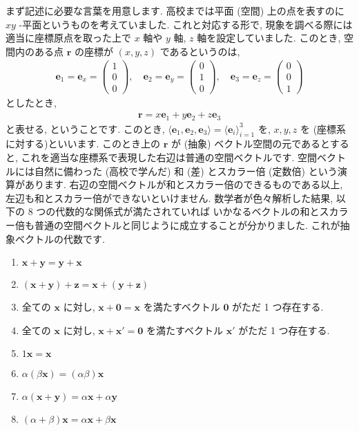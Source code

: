 \documentclass[openany, a4paper, oneside]{jsbook}
\begin{document}
まず記述に必要な言葉を用意します.
高校までは平面 (空間) 上の点を表すのに $x y$ -平面というものを考えていました.
これと対応する形で, 現象を調べる際には適当に座標原点を取った上で $x$ 軸や $y$ 軸,  $z$ 軸を設定していました.
このとき, 空間内のある点 $\bm{r}$ の座標が $(x,y,z)$ であるというのは,
\begin{align}
    \bm{e}_1
    =
    \bm{e}_x
    =
    \begin{pmatrix}
        1 \\ 0 \\ 0
    \end{pmatrix},
    \quad
    \bm{e}_2
    =
    \bm{e}_y
    =
    \begin{pmatrix}
        0 \\ 1 \\ 0
    \end{pmatrix},
    \quad
    \bm{e}_3
    =
    \bm{e}_z
    =
    \begin{pmatrix}
        0 \\ 0 \\ 1
    \end{pmatrix}
\end{align}
としたとき,
\begin{align}
    \bm{r}
    =
    x \bm{e}_1 + y \bm{e}_2 + z \bm{e}_3
\end{align}
と表せる, ということです.
このとき,
$\langle \bm{e}_1 , \bm{e}_2, \bm{e}_3 \rangle = \langle \bm{e}_i \rangle _{i=1}^3$
を, $x,y,z$ を (座標系に対する)といいます.
このとき上の $\bm{r}$ が (抽象) ベクトル空間の元であるとすると,
これを適当な座標系で表現した右辺は普通の空間ベクトルです.
空間ベクトルには自然に備わった (高校で学んだ) 和 (差) とスカラー倍 (定数倍) という演算があります.
右辺の空間ベクトルが和とスカラー倍のできるものである以上, 左辺も和とスカラー倍ができないといけません.
数学者が色々解析した結果, 以下の 8 つの代数的な関係式が満たされていれば
いかなるベクトルの和とスカラー倍も普通の空間ベクトルと同じように成立することが分かりました.
これが抽象ベクトルの代数です.
\begin{enumerate}
\item  $\bm{x} + \bm{y} = \bm{y} + \bm{x}$
\item  $(\bm{x} + \bm{y} ) + \bm{z} = \bm{x} + ( \bm{y} + \bm{z})$
\item 全ての $\bm{x}$ に対し,  $\bm{x} + \bm{0} = \bm{x}$ を満たすベクトル $\bm{0}$ がただ 1 つ存在する.
\item 全ての $\bm{x}$ に対し,  $\bm{x} + \bm{x}' = \bm{0}$ を満たすベクトル $\bm{x}'$ がただ 1 つ存在する.
\item  $1\bm{x} = \bm{x}$
\item  $\alpha (\beta \bm{x}) = (\alpha \beta) \bm{x}$
\item  $\alpha (\bm{x} + \bm{y} ) = \alpha \bm{x} + \alpha \bm{y}$
\item  $(\alpha + \beta ) \bm{x} = \alpha \bm{x} + \beta \bm{x}$
\end{enumerate}
\end{document}
